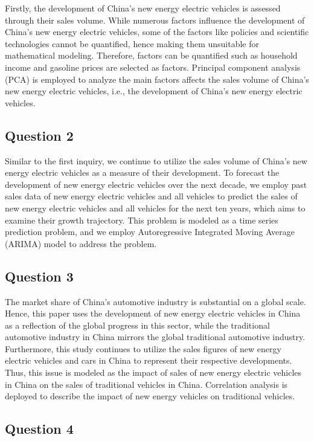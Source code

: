 \documentclass{apmcmthesis}
\begin{document}
Firstly, the development of China's new energy electric vehicles is assessed through their sales volume. While numerous factors influence the development of China's new energy electric vehicles, some of the factors like policies and scientific technologies cannot be quantified, hence making them unsuitable for mathematical modeling. Therefore, factors can be quantified such as household income and gasoline prices are selected as factors. Principal component analysis (PCA) is employed to analyze the main factors affects the sales volume of China's new energy electric vehicles, i.e., the development of China's new energy electric vehicles.

\subsection{Question 2}

Similar to the first inquiry, we continue to utilize the sales volume of China's new energy electric vehicles as a measure of their development. To forecast the development of new energy electric vehicles over the next decade, we employ past sales data of new energy electric vehicles and all vehicles to predict the sales of new energy electric vehicles and all vehicles for the next ten years, which aims to examine their growth trajectory. This problem is modeled as a time series prediction problem, and we employ Autoregressive Integrated Moving Average (ARIMA) model to address the problem.

\subsection{Question 3}


The market share of China's automotive industry is substantial on a global scale. Hence, this paper uses the development of new energy electric vehicles in China as a reflection of the global progress in this sector, while the traditional automotive industry in China mirrors the global traditional automotive industry. Furthermore, this study continues to utilize the sales figures of new energy electric vehicles and cars in China to represent their respective developments. Thus, this issue is modeled as the impact of sales of new energy electric vehicles in China on the sales of traditional vehicles in China. Correlation analysis is deployed to describe the impact of new energy vehicles on traditional vehicles.

\subsection{Question 4}
\end{document}
